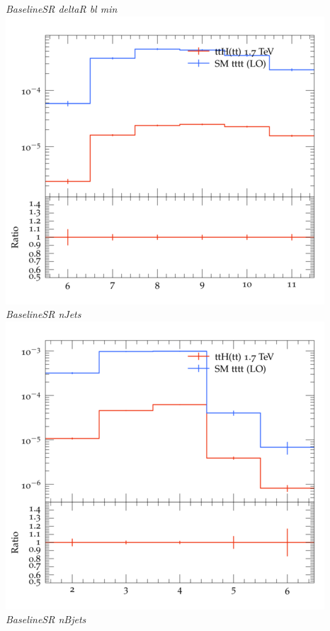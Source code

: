 \documentclass{beamer}
\begin{document}
\begin{frame}
\begin{columns}
\textit{\small BaselineSR deltaR bl min}
\includegraphics[width=\textwidth]{../plots/ttH_1700/tttt_ttH_1LOS/BaselineSR_nJets.png}\\
\textit{\small BaselineSR nJets}
\includegraphics[width=\textwidth]{../plots/ttH_1700/tttt_ttH_1LOS/BaselineSR_nBjets.png}\\
\textit{\small BaselineSR nBjets}
\end{columns}
\end{frame}
\end{document}
